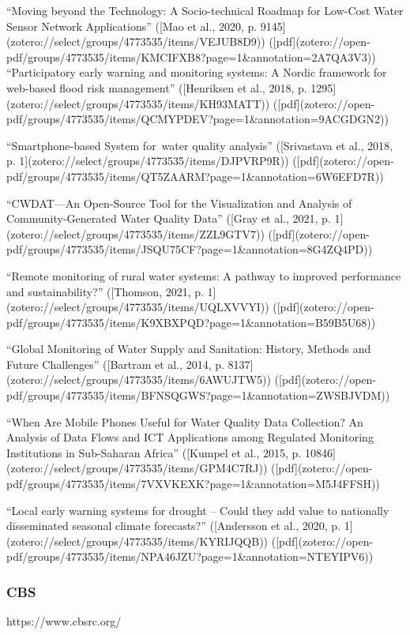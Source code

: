 {“Moving beyond the Technology: A Socio-technical Roadmap for Low-Cost Water Sensor Network Applications” ([Mao et al., 2020, p. 9145](zotero://select/groups/4773535/items/VEJUB8D9)) ([pdf](zotero://open-pdf/groups/4773535/items/KMCIFXB8?page=1&annotation=2A7QA3V3))
“Participatory early warning and monitoring systems: A Nordic framework for web-based flood risk management” ([Henriksen et al., 2018, p. 1295](zotero://select/groups/4773535/items/KH93MATT)) ([pdf](zotero://open-pdf/groups/4773535/items/QCMYPDEV?page=1&annotation=9ACGDGN2))

“Smartphone‑based System for water quality analysis” ([Srivastava et al., 2018, p. 1](zotero://select/groups/4773535/items/DJPVRP9R)) ([pdf](zotero://open-pdf/groups/4773535/items/QT5ZAARM?page=1&annotation=6W6EFD7R))

“CWDAT—An Open-Source Tool for the Visualization and Analysis of Community-Generated Water Quality Data” ([Gray et al., 2021, p. 1](zotero://select/groups/4773535/items/ZZL9GTV7)) ([pdf](zotero://open-pdf/groups/4773535/items/JSQU75CF?page=1&annotation=8G4ZQ4PD))

“Remote monitoring of rural water systems: A pathway to improved performance and sustainability?” ([Thomson, 2021, p. 1](zotero://select/groups/4773535/items/UQLXVVYI)) ([pdf](zotero://open-pdf/groups/4773535/items/K9XBXPQD?page=1&annotation=B59B5U68))

“Global Monitoring of Water Supply and Sanitation: History, Methods and Future Challenges” ([Bartram et al., 2014, p. 8137](zotero://select/groups/4773535/items/6AWUJTW5)) ([pdf](zotero://open-pdf/groups/4773535/items/BFNSQGWS?page=1&annotation=ZWSBJVDM))

“When Are Mobile Phones Useful for Water Quality Data Collection? An Analysis of Data Flows and ICT Applications among Regulated Monitoring Institutions in Sub-Saharan Africa” ([Kumpel et al., 2015, p. 10846](zotero://select/groups/4773535/items/GPM4C7RJ)) ([pdf](zotero://open-pdf/groups/4773535/items/7VXVKEXK?page=1&annotation=M5J4FFSH))

“Local early warning systems for drought – Could they add value to nationally disseminated seasonal climate forecasts?” ([Andersson et al., 2020, p. 1](zotero://select/groups/4773535/items/KYRIJQQB)) ([pdf](zotero://open-pdf/groups/4773535/items/NPA46JZU?page=1&annotation=NTEYIPV6))

\subsubsection{CBS}
https://www.cbsrc.org/

}
